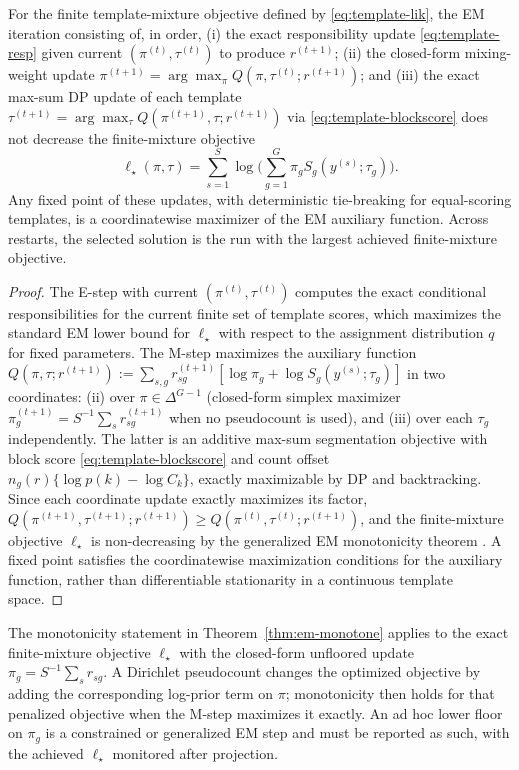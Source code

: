 \begin{theorem}
\label{thm:em-monotone}
For the finite template-mixture objective defined by \eqref{eq:template-lik}, the EM iteration
consisting of, in order,
(i) the exact responsibility update \eqref{eq:template-resp} given current $(\pi^{(t)},\tau^{(t)})$
to produce $r^{(t+1)}$;
(ii) the closed-form mixing-weight update
$\pi^{(t+1)} = \arg\max_\pi Q(\pi,\tau^{(t)};r^{(t+1)})$; and
(iii) the exact max-sum DP update of each template
$\tau^{(t+1)} = \arg\max_\tau Q(\pi^{(t+1)},\tau;r^{(t+1)})$ via \eqref{eq:template-blockscore}
does not decrease the finite-mixture objective
\[
\ell_\star(\pi,\tau) = \sum_{s=1}^S \log\Big(\sum_{g=1}^G \pi_g S_g(y^{(s)};\tau_g)\Big).
\]
Any fixed point of these updates, with deterministic tie-breaking for equal-scoring templates, is a
coordinatewise maximizer of the EM auxiliary function. Across restarts, the selected solution is the
run with the largest achieved finite-mixture objective.
\end{theorem}

\begin{proof}
The E-step with current $(\pi^{(t)},\tau^{(t)})$ computes the exact conditional responsibilities
for the current finite set of template scores, which maximizes the standard EM lower bound for
$\ell_\star$ with respect to the assignment distribution $q$ for fixed parameters. The M-step
maximizes the auxiliary function
$Q(\pi,\tau;r^{(t+1)}):=\sum_{s,g}r^{(t+1)}_{sg}[\log\pi_g+\log S_g(y^{(s)};\tau_g)]$ in two
coordinates: (ii) over $\pi\in\Delta^{G-1}$ (closed-form simplex maximizer
$\pi_g^{(t+1)}=S^{-1}\sum_s r^{(t+1)}_{sg}$ when no pseudocount is used), and (iii) over each
$\tau_g$ independently. The latter is an additive max-sum segmentation objective with block score
\eqref{eq:template-blockscore} and count offset $n_g(r)\{\log p(k)-\log C_k\}$, exactly
maximizable by DP and backtracking. Since each coordinate update exactly maximizes its factor,
$Q(\pi^{(t+1)},\tau^{(t+1)};r^{(t+1)})\ge Q(\pi^{(t)},\tau^{(t)};r^{(t+1)})$, and the finite-mixture
objective $\ell_\star$ is non-decreasing by the generalized EM monotonicity theorem
\citep{dempster1977em}. A fixed point satisfies the coordinatewise maximization conditions for the
auxiliary function, rather than differentiable stationarity in a continuous template space.
\end{proof}

\begin{remark}
The monotonicity statement in Theorem~\ref{thm:em-monotone} applies to the exact finite-mixture
objective $\ell_\star$ with the closed-form unfloored update $\pi_g=S^{-1}\sum_s r_{sg}$. A
Dirichlet pseudocount changes the optimized objective by adding the corresponding log-prior term on
$\pi$; monotonicity then holds for that penalized objective when the M-step maximizes it exactly. An
ad hoc lower floor on $\pi_g$ is a constrained or generalized EM step and must be reported as such,
with the achieved $\ell_\star$ monitored after projection.
\end{remark}


